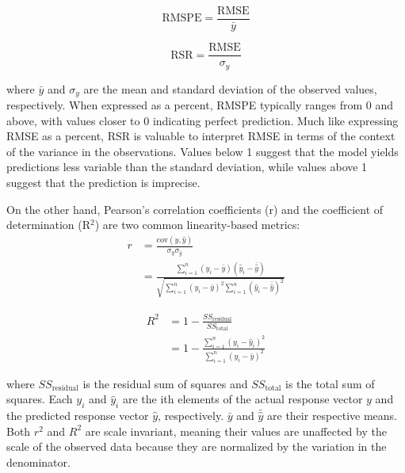 \begin{equation} \label{eq_rmspe}
    \text{RMSPE} = \frac{\text{RMSE}}{\bar{y}}
\end{equation}

\begin{equation} \label{eq_rsr}
    \text{RSR} = \frac{\text{RMSE}}{\sigma_y}
\end{equation}

where $\bar{y}$ and $\sigma_y$ are the mean and standard deviation of the observed values, respectively. When expressed as a percent, RMSPE typically ranges from 0 and above, with values closer to 0 indicating perfect prediction. Much like expressing RMSE as a percent, RSR is valuable to interpret RMSE in terms of the context of the variance in the observations. Values below 1 suggest that the model yields predictions less variable than the standard deviation, while values above 1 suggest that the prediction is imprecise.

On the other hand, Pearson's correlation coefficients (r) and the coefficient of determination (R$^2$) are two common linearity-based metrics:
\begin{equation}
    \begin{aligned}
    r &= \frac{\text{cov}(y, \hat{y})}{\sigma_y \sigma_{\hat{y}}} \\
    &= \frac{\sum_{i=1}^{n} (y_i - \bar{y})(\hat{y}_i - \bar{\hat{y}})}{\sqrt{\sum_{i=1}^{n} (y_i - \bar{y})^2 \sum_{i=1}^{n} (\hat{y}_i - \bar{\hat{y}})^2}}
    \end{aligned}
\end{equation}

\begin{equation}
    \begin{aligned}
    R^2 &= 1 - \frac{SS_{\text{residual}}}{SS_{\text{total}}} \\
    &= 1 - \frac{\sum_{i=1}^{n} (y_i - \hat{y}_i)^2}{\sum_{i=1}^{n} (y_i - \bar{y})^2}
    \end{aligned}
\end{equation}

where \(SS_{\text{residual}}\) is the residual sum of squares and \(SS_{\text{total}}\) is the total sum of squares. Each \(y_i\) and \(\hat{y}_i\) are the ith elements of the actual response vector \(y\) and the predicted response vector \(\hat{y}\), respectively. \(\bar{y}\) and \(\bar{\hat{y}}\) are their respective means. Both \(r^2\) and \(R^2\) are scale invariant, meaning their values are unaffected by the scale of the observed data because they are normalized by the variation in the denominator.

